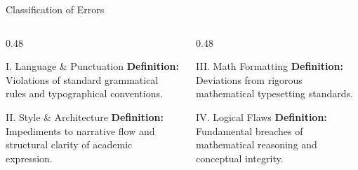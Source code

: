 \documentclass{beamer}
\begin{document}
\begin{frame}{Classification of Errors}

    \begin{columns}[T]
        \begin{column}{0.48\textwidth}
            \begin{block}{\small I. Language \& Punctuation}
                \small
                \textbf{Definition:} Violations of standard grammatical rules and typographical conventions.
            \end{block}
            
            \vspace{4mm} %
            
            \begin{block}{\small II. Style \& Architecture}
                \small
                \textbf{Definition:} Impediments to narrative flow and structural clarity of academic expression.
            \end{block}
        \end{column}

        \begin{column}{0.48\textwidth}
            \begin{block}{\small III. Math Formatting}
                \small
                \textbf{Definition:} Deviations from rigorous mathematical typesetting standards.
            \end{block}
            
            \vspace{4mm}
            
            \begin{block}{\small IV. Logical Flaws}
                \small
                \textbf{Definition:} Fundamental breaches of mathematical reasoning and conceptual integrity.
            \end{block}
        \end{column}
    \end{columns}
\end{frame}
\end{document}

